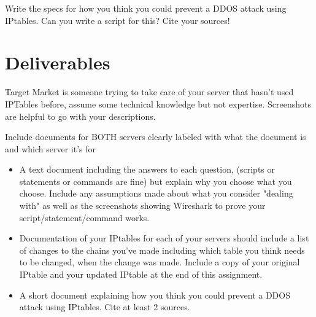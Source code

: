 \documentclass[12pt]{article}
\begin{document}
 Write the specs for how you think you could prevent a DDOS attack using IPtables.  Can you write a script for this? Cite your sources!
\section*{Deliverables}
Target Market is someone trying to take care of your server that hasn't used IPTables before, assume some technical knowledge but not expertise.  Screenshots are helpful to go with your descriptions. 

Include documents for BOTH servers clearly labeled with what the document is and which server it's for

\begin{itemize}
    \item  A text document including the answers to each question, (scripts or statements or commands are fine) but explain why you choose what you choose. Include any assumptions made about what you consider "dealing with" as well as the screenshots showing Wireshark to prove your script/statement/command works.  
    \item Documentation of your IPtables for each of your servers should include a list of changes to the chains you've made including which table you think needs to be changed, when the change was made. Include a copy of your original IPtable and your updated IPtable at the end of this assignment. 
    \item A short document explaining how you think you could prevent a DDOS attack using IPtables.  Cite at least 2 sources.
\end{itemize}
\end{document}
